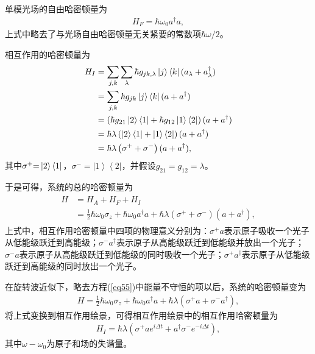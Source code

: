 单模光场的自由哈密顿量为
\begin{align}
{H_F} = \hbar {\omega _0}{a^\dag }a,\label{eq53}
\end{align}
上式中略去了与光场自由哈密顿量无关紧要的常数项$\hbar \omega/2$。

相互作用的哈密顿量为
\begin{align}\label{eq54}
\begin{split}
{H_I} &= \sum\limits_{j,k} {\sum\limits_\lambda  {\hbar {g_{jk,\lambda }}} } \left| j \right\rangle \left\langle k \right|({a_\lambda } + a_\lambda ^\dag )\\
&= \sum\limits_{j,k} {\hbar {g_{jk}}\left| j \right\rangle \left\langle k \right|(a + {a^\dag })} \\
&= \left( {\hbar {g_{21}}\left| 2 \right\rangle \left\langle 1 \right| + \hbar {g_{12}}\left| 1 \right\rangle \left\langle 2 \right|} \right)(a + {a^\dag })\\
&= \hbar \lambda \left( {\left| 2 \right\rangle \left\langle 1 \right| + \left| 1 \right\rangle \left\langle 2 \right|} \right)(a + {a^\dag })\\
&= \hbar \lambda \left( {{\sigma ^{\rm{ + }}} + {\sigma ^ - }} \right)(a + {a^\dag }),
\end{split}
\end{align}
其中${\sigma ^ + }{\rm{ = }}\left| 2 \right\rangle \left\langle 1 \right|$，${\sigma ^ - } = \left| 1 \right\rangle \left\langle 2 \right|$，并假设$g_{21}=g_{12}=\lambda$。

于是可得，系统的总的哈密顿量为
\begin{align}\label{eq55}
\begin{split}
H &= {H_A} + {H_F} + {H_I}\\
&= \frac{1}{2}\hbar {\omega _0}{\sigma _z} + \hbar {\omega _0}{a^\dag }a + \hbar \lambda \left( {{\sigma ^ + } + {\sigma ^ - }} \right)(a + {a^\dag }),
\end{split}
\end{align}
上式中，相互作用哈密顿量中四项的物理意义分别为：$\sigma^+a$表示原子吸收一个光子从低能级跃迁到高能级；$\sigma^-a^\dagger$表示原子从高能级跃迁到低能级并放出一个光子；$\sigma^-a$表示原子从高能级跃迁到低能级的同时吸收一个光子；$\sigma^+a^\dagger$表示原子从低能级跃迁到高能级的同时放出一个光子。

在旋转波近似下，略去方程(\ref{eq55})中能量不守恒的项以后，系统的哈密顿量变为
\begin{align}
H = \frac{1}{2}\hbar {\omega _0}{\sigma _z} + \hbar {\omega _0}{a^\dag }a + \hbar \lambda \left( {{\sigma ^ + }a + {\sigma ^ - }{a^\dag }} \right),\label{eq56}
\end{align}
将上式变换到相互作用绘景，可得相互作用绘景中的相互作用哈密顿量为
\begin{align}
{H_I} = \hbar \lambda \left( {{\sigma ^ + }a{e^{i\Delta t}} + {a^\dag }{\sigma ^ - }{e^{ - i\Delta t}}} \right),\label{eq57}
\end{align}
其中$\omega-\omega_0$为原子和场的失谐量。

